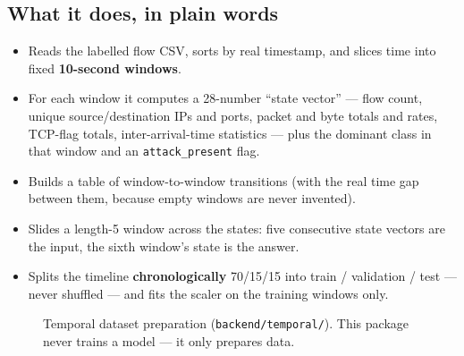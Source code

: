 \documentclass[11pt,a4paper]{article}
\begin{document}
\subsection*{What it does, in plain words}
\begin{itemize}
\item Reads the labelled flow CSV, sorts by real timestamp, and slices time into
  fixed \textbf{10-second windows}.
\item For each window it computes a 28-number ``state vector'' --- flow count,
  unique source/destination IPs and ports, packet and byte totals and rates,
  TCP-flag totals, inter-arrival-time statistics --- plus the dominant class in
  that window and an \texttt{attack\_present} flag.
\item Builds a table of window-to-window transitions (with the real time gap
  between them, because empty windows are never invented).
\item Slides a length-5 window across the states: five consecutive state vectors
  are the input, the sixth window's state is the answer.
\item Splits the timeline \textbf{chronologically} 70/15/15 into train /
  validation / test --- never shuffled --- and fits the scaler on the training
  windows only.
\end{itemize}

\begin{figure}[H]\centering
{}
\caption{Temporal dataset preparation (\texttt{backend/temporal/}). This package
never trains a model --- it only prepares data.}
\end{figure}
\end{document}
